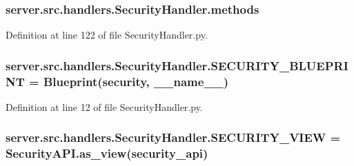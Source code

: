\subsubsection[{\texorpdfstring{methods}{methods}}]{\setlength{\rightskip}{0pt plus 5cm}server.\+src.\+handlers.\+Security\+Handler.\+methods}\hypertarget{namespaceserver_1_1src_1_1handlers_1_1_security_handler_ad2b2d768d34647c0b3356732a078c933}{}\label{namespaceserver_1_1src_1_1handlers_1_1_security_handler_ad2b2d768d34647c0b3356732a078c933}


Definition at line 122 of file Security\+Handler.\+py.

\subsubsection[{\texorpdfstring{S\+E\+C\+U\+R\+I\+T\+Y\+\_\+\+B\+L\+U\+E\+P\+R\+I\+NT}{SECURITY_BLUEPRINT}}]{\setlength{\rightskip}{0pt plus 5cm}server.\+src.\+handlers.\+Security\+Handler.\+S\+E\+C\+U\+R\+I\+T\+Y\+\_\+\+B\+L\+U\+E\+P\+R\+I\+NT = Blueprint(\textquotesingle{}security\textquotesingle{}, \+\_\+\+\_\+name\+\_\+\+\_\+)}\hypertarget{namespaceserver_1_1src_1_1handlers_1_1_security_handler_abafd35a5560f8a40e2eca6bef3024066}{}\label{namespaceserver_1_1src_1_1handlers_1_1_security_handler_abafd35a5560f8a40e2eca6bef3024066}


Definition at line 12 of file Security\+Handler.\+py.

\subsubsection[{\texorpdfstring{S\+E\+C\+U\+R\+I\+T\+Y\+\_\+\+V\+I\+EW}{SECURITY_VIEW}}]{\setlength{\rightskip}{0pt plus 5cm}server.\+src.\+handlers.\+Security\+Handler.\+S\+E\+C\+U\+R\+I\+T\+Y\+\_\+\+V\+I\+EW = Security\+A\+P\+I.\+as\+\_\+view(\textquotesingle{}security\+\_\+api\textquotesingle{})}\hypertarget{namespaceserver_1_1src_1_1handlers_1_1_security_handler_a13760d09684005351721e9c4e82afcbd}{}\label{namespaceserver_1_1src_1_1handlers_1_1_security_handler_a13760d09684005351721e9c4e82afcbd}


